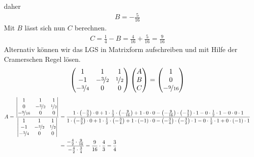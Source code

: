 \documentclass[11pt,a4paper,DIV=12]{scrartcl}
\begin{document}
%
%
daher
%
\begin{gather}
	B = -\frac{5}{16}
\end{gather}
%
Mit $B$ lässt sich nun $C$ berechnen.
%
\begin{gather}
	C = \frac{1}{4} - B = \frac{4}{16} + \frac{5}{16} = \frac{9}{16}
\end{gather}
%
Alternativ können wir das LGS in Matrixform aufschreiben und mit Hilfe der 
Cramerschen Regel lösen.
\begin{gather}
	\begin{pmatrix}
		1 & 1 & 1 \\
		-1 & -\nicefrac{3}{2} & \nicefrac{1}{2} \\
		-\nicefrac{3}{4} & 0 & 0
	\end{pmatrix}
	\begin{pmatrix}
		A \\
		B \\
		C
	\end{pmatrix}
	=
	\begin{pmatrix}
		1 \\
		0 \\
		-\nicefrac{9}{16}
	\end{pmatrix}
\end{gather}
%
%
%
\begin{align}
	A=
	\frac{
		\begin{vmatrix}
			1 & 1 & 1 \\
			0 & -\nicefrac{3}{2} & \nicefrac{1}{2} \\
			-\nicefrac{9}{16} &0& 0
		\end{vmatrix}
	}
	{
		\begin{vmatrix}
			1 & 1 & 1 \\
			-1 & -\nicefrac{3}{2} & \nicefrac{1}{2} \\
			-\nicefrac{3}{4} & 0 & 0
		\end{vmatrix}
	}
	&=\frac{1\cdot \left(-\frac{3}{2}\right) \cdot 0 + 1\cdot \frac{1}{2} \cdot\left(-\frac{9}{16}\right) +1\cdot 0 \cdot 0- \left(-\frac{9}{16}\right)\cdot \left(-\frac{3}{2}\right)\cdot 1-0\cdot \frac{1}{2}\cdot 1 - 0 \cdot 0 \cdot 1}
	{1\cdot \left(-\frac{3}{2}\right)\cdot 0 +1\cdot \frac{1}{2}\cdot \left(-\frac{3}{4}\right)+1\cdot \left(-1\right) \cdot 0- \left(-\frac{3}{4}\right)\cdot \left(-\frac{3}{2}\right)\cdot 1 -0\cdot \frac{1}{2}\cdot 1 + 0\cdot \left(-1\right) \cdot 1}\nonumber \\
	&=\frac{-\frac{4}{2}\cdot\frac{9}{16}}{-\frac{4}{2}\cdot\frac{3}{4}}=\frac{9}{16}\cdot\frac{4}{3}=\frac{3}{4}
\end{align}
\end{document}
